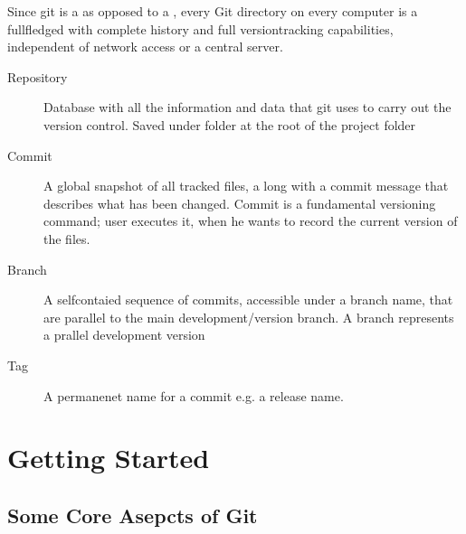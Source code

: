 \documentclass[a4paper,10pt,english]{jupyterBook}
\begin{document}
\sphinxAtStartPar
Since git is a  as opposed to a , every Git directory on every computer is a full\sphinxhyphen{}fledged  with complete history and full version\sphinxhyphen{}tracking capabilities, independent of network access or a central server.
\begin{description}
\item[{Repository\label{\detokenize{text/progtut/versioncontrol:term-Repository}}}] \leavevmode
\sphinxAtStartPar
Database with all the information and data that git uses to carry out the version control. Saved under  folder at the root of the project folder

\item[{Commit\label{\detokenize{text/progtut/versioncontrol:term-Commit}}}] \leavevmode
\sphinxAtStartPar
A global snapshot of all tracked files, a long with a commit message that describes what has been changed. Commit is a fundamental versioning command; user executes it, when he wants to record the current version of the files.

\item[{Branch \label{\detokenize{text/progtut/versioncontrol:term-Branch}}}] \leavevmode
\sphinxAtStartPar
A self\sphinxhyphen{}contaied sequence of commits, accessible under a branch name, that are parallel to the main development/version branch. A branch represents a prallel development version

\item[{Tag\label{\detokenize{text/progtut/versioncontrol:term-Tag}}}] \leavevmode
\sphinxAtStartPar
A permanenet name for a commit \sphinxhyphen{} e.g. a release name.

\end{description}

\sphinxstepscope


\section{Getting Started}
\label{\detokenize{text/progtut/gitstart:getting-started}}\label{\detokenize{text/progtut/gitstart::doc}}

\subsection{Some Core Asepcts of Git}
\label{\detokenize{text/progtut/gitstart:some-core-asepcts-of-git}}
\end{document}

